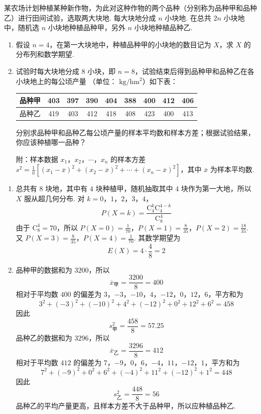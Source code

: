 \begin{problem}
某农场计划种植某种新作物，为此对这种作物的两个品种（分别称为品种甲和品种乙）进行田间试验，选取两大块地. 每大块地分成 \(n\) 小块地. 在总共 \(2n\) 小块地中，随机选 \(n\) 小块地种植品种甲，另外 \(n\) 小块地种植品种乙.
\begin{enumerate}
\item 假设 \(n = 4\)，在第一大块地中，种植品种甲的小块地的数目记为 \(X\)，求 \(X\) 的分布列和数学期望.
\item 试验时每大块地分成 \(8\) 小块，即 \(n = 8\)，试验结束后得到品种甲和品种乙在各小块地上的每公顷产量 （单位： \(\mathrm{kg/hm^2}\)）如下表：
\begin{center}
\begin{tabular}{c|cccccccc}
\hline
品种甲 & 403 & 397 & 390 & 404 & 388 & 400 & 412 & 406 \\
\hline
品种乙 & 419 & 403 & 412 & 418 & 408 & 423 & 400 & 413 \\
\hline
\end{tabular}
\end{center}
分别求品种甲和品种乙每公顷产量的样本平均数和样本方差；根据试验结果，你应该种植哪一品种？

附：样本数据 \(x_{1}\)，\(x_{2}\)，\(\cdots\)，\(x_{n}\) 的样本方差 \(s^{2} = \frac{1}{n}[(x_{1} - \overline{x})^{2} + (x_{2} - \overline{x})^{2} + \cdots + (x_{n} - \overline{x})^{2}]\)，其中 \(\overline{x}\) 为样本平均数.
\end{enumerate}
\end{problem}

\begin{solution}
\begin{enumerate}
\item 总共有 \(8\) 块地，其中有 \(4\) 块种植甲，随机抽取其中 \(4\) 块作为第一大地，所以 \(X\) 服从超几何分布. 对 \(k=0\)，\(1\)，\(2\)，\(3\)，\(4\)，
\[
P(X=k)=\frac{\mathrm C_{4}^{k}\mathrm C_{4}^{4-k}}{\mathrm C_{8}^{4}}
\]
由于 \(\mathrm C_{8}^{4}=70\)，所以 \(P(X=0)=\frac1{70}\)，\(P(X=1)=\frac8{35}\)，\(P(X=2)=\frac{18}{35}\). 又 \(P(X=3)=\frac8{35}\)，\(P(X=4)=\frac1{70}\).
其数学期望为
\[
E(X)=4\cdot\frac4{8}=2
\]
\item 品种甲的数据和为 \(3200\)，所以
\[
\overline{x}_{\text{甲}}=\frac{3200}{8}=400
\]
相对于平均数 \(400\) 的偏差为 \(3\)，\(-3\)，\(-10\)，\(4\)，\(-12\)，\(0\)，\(12\)，\(6\)，平方和为
\[
3^{2}+(-3)^{2}+(-10)^{2}+4^{2}+(-12)^{2}+0^{2}+12^{2}+6^{2}=458
\]
因此
\[
s_{\text{甲}}^{2}=\frac{458}{8}=57.25
\]
品种乙的数据和为 \(3296\)，所以
\[
\overline{x}_{\text{乙}}=\frac{3296}{8}=412
\]
相对于平均数 \(412\) 的偏差为 \(7\)，\(-9\)，\(0\)，\(6\)，\(-4\)，\(11\)，\(-12\)，\(1\)，平方和为
\[
7^{2}+(-9)^{2}+0^{2}+6^{2}+(-4)^{2}+11^{2}+(-12)^{2}+1^{2}=448
\]
因此
\[
s_{\text{乙}}^{2}=\frac{448}{8}=56
\]
品种乙的平均产量更高，且样本方差不大于品种甲，所以应种植品种乙.
\end{enumerate}
\end{solution}

